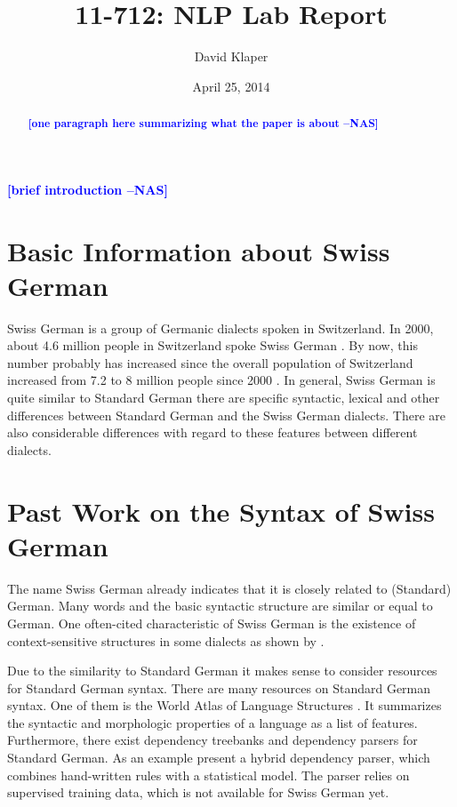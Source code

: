 \documentclass[11pt,letterpaper]{article}
\title{11-712:  NLP Lab Report}
\author{David Klaper}
\date{April 25, 2014 \nascomment{due date}}
\newcommand{\nascomment}[1]{\textcolor{blue}{\textbf{[#1 --NAS]}}}
\begin{document}
\maketitle
\begin{abstract}
\nascomment{one paragraph here summarizing what the paper is about}
\end{abstract}

\nascomment{brief introduction}

\section{Basic Information about Swiss German}

Swiss German is a group of Germanic dialects spoken in Switzerland. In 2000, about 4.6 million people in Switzerland spoke Swiss German \citep{LGC13}. By now, this number probably has increased since the overall population of Switzerland increased from 7.2 to 8 million people since 2000 \citep{BFS13}. In general, Swiss German is quite similar to Standard German there are specific syntactic, lexical and other differences between Standard German and the Swiss German dialects. There are also considerable differences with regard to these features between different dialects. \citep{Scherrer11}

\section{Past Work on the Syntax of Swiss German}

The name Swiss German already indicates that it is closely related to (Standard) German. Many words and the basic syntactic structure are similar or equal to German. One often-cited characteristic of Swiss German is the existence of context-sensitive structures in some dialects as shown by \cite{Shieber85}.

Due to the similarity to Standard German it makes sense to consider resources for Standard German syntax. There are many resources on Standard German syntax. One of them is the World Atlas of Language Structures \citep{DH13}. It summarizes the syntactic and morphologic properties of a language as a list of features. Furthermore, there exist dependency treebanks and dependency parsers for Standard German. As an example \citet{SSVW09} present a hybrid dependency parser, which combines hand-written rules with a statistical model. The parser relies on supervised training data, which is not available for Swiss German yet.
\end{document}
